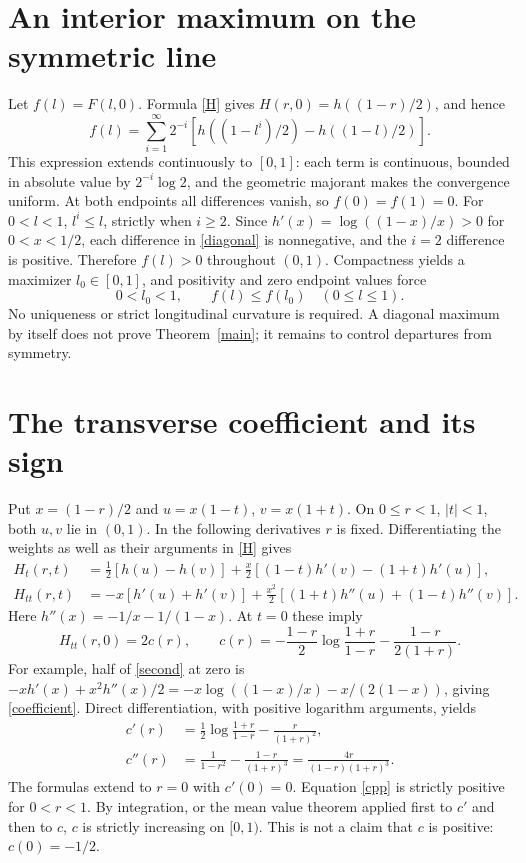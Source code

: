 \documentclass[11pt]{article}
\begin{document}
\section{An interior maximum on the symmetric line}
Let $f(l)=F(l,0)$. Formula \eqref{H} gives $H(r,0)=h((1-r)/2)$, and hence
\begin{equation}
 f(l)=\sum_{i=1}^{\infty}2^{-i}
 \left[h((1-l^i)/2)-h((1-l)/2)\right].\label{diagonal}
\end{equation}
This expression extends continuously to $[0,1]$: each term is continuous, bounded in absolute value by $2^{-i}\log2$, and the geometric majorant makes the convergence uniform. At both endpoints all differences vanish, so $f(0)=f(1)=0$. For $0<l<1$, $l^i\leq l$, strictly when $i\geq2$. Since $h'(x)=\log((1-x)/x)>0$ for $0<x<1/2$, each difference in \eqref{diagonal} is nonnegative, and the $i=2$ difference is positive. Therefore $f(l)>0$ throughout $(0,1)$. Compactness yields a maximizer $l_0\in[0,1]$, and positivity and zero endpoint values force
\begin{equation}
 0<l_0<1,\qquad f(l)\leq f(l_0)\quad(0\leq l\leq1).\label{maxdiag}
\end{equation}
No uniqueness or strict longitudinal curvature is required. A diagonal maximum by itself does not prove Theorem~\ref{main}; it remains to control departures from symmetry.

\section{The transverse coefficient and its sign}
Put $x=(1-r)/2$ and $u=x(1-t)$, $v=x(1+t)$. On $0\leq r<1$, $|t|<1$, both $u,v$ lie in $(0,1)$. In the following derivatives $r$ is fixed. Differentiating the weights as well as their arguments in \eqref{H} gives
\begin{align}
 H_t(r,t)&=\tfrac12[h(u)-h(v)]
 +\tfrac{x}{2}[(1-t)h'(v)-(1+t)h'(u)],\label{first}\\
 H_{tt}(r,t)&=-x[h'(u)+h'(v)]
 +\tfrac{x^2}{2}[(1+t)h''(u)+(1-t)h''(v)].\label{second}
\end{align}
Here $h''(x)=-1/x-1/(1-x)$. At $t=0$ these imply
\begin{equation}
 H_{tt}(r,0)=2c(r),\qquad
 c(r)=-\frac{1-r}{2}\log\frac{1+r}{1-r}
       -\frac{1-r}{2(1+r)}.\label{coefficient}
\end{equation}
For example, half of \eqref{second} at zero is
$-xh'(x)+x^2h''(x)/2=-x\log((1-x)/x)-x/(2(1-x))$, giving \eqref{coefficient}. Direct differentiation, with positive logarithm arguments, yields
\begin{align}
 c'(r)&=\tfrac12\log\frac{1+r}{1-r}-\frac{r}{(1+r)^2},\label{cp}\\
 c''(r)&=\frac1{1-r^2}-\frac{1-r}{(1+r)^3}
       =\frac{4r}{(1-r)(1+r)^3}.\label{cpp}
\end{align}
The formulas extend to $r=0$ with $c'(0)=0$. Equation \eqref{cpp} is strictly positive for $0<r<1$. By integration, or the mean value theorem applied first to $c'$ and then to $c$, $c$ is strictly increasing on $[0,1)$. This is not a claim that $c$ is positive: $c(0)=-1/2$.
\end{document}
